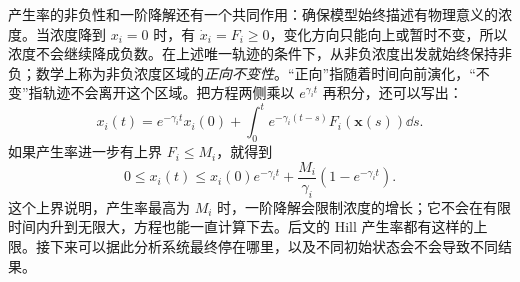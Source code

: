 产生率的非负性和一阶降解还有一个共同作用：确保模型始终描述有物理意义的浓度。当浓度降到 $x_i=0$ 时，有 $\dot x_i=F_i\geq0$，变化方向只能向上或暂时不变，所以浓度不会继续降成负数。在上述唯一轨迹的条件下，从非负浓度出发就始终保持非负；数学上称为非负浓度区域的\emph{正向不变性}。“正向”指随着时间向前演化，“不变”指轨迹不会离开这个区域。把方程两侧乘以 $e^{\gamma_i t}$ 再积分，还可以写出：
\[
x_i(t)=e^{-\gamma_it}x_i(0)+\int_0^t e^{-\gamma_i(t-s)}F_i(\bm x(s))\dd s.
\]
如果产生率进一步有上界 $F_i\leq M_i$，就得到
\begin{equation}
0\leq x_i(t)\leq x_i(0)e^{-\gamma_it}+\frac{M_i}{\gamma_i}(1-e^{-\gamma_it}).\label{eq:bound}
\end{equation}
这个上界说明，产生率最高为 $M_i$ 时，一阶降解会限制浓度的增长；它不会在有限时间内升到无限大，方程也能一直计算下去。后文的 Hill 产生率都有这样的上限。接下来可以据此分析系统最终停在哪里，以及不同初始状态会不会导致不同结果。
